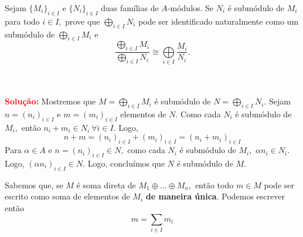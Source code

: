 \documentclass[11pt,a4paper]{article}
\newcounter{exercicio}[section]
\newcommand{\solucao}[1]{
\textbf{\textcolor{white}{oi}\\ \\ \textcolor{red}{Solução:}} #1}
\begin{document}
 Sejam $\{ M_i\}_{i \in I}$ e $\{ N_i\}_{i \in I}$ duas famílias de $A$-módulos. Se $N_i$ é submódulo de $M_i$ para todo $i \in I,$ prove que $\bigoplus\limits_{i \in I} N_i$ pode ser identificado naturalmente como um submódulo de $\bigoplus\limits_{i \in I} M_i$ e   \[\frac{\bigoplus\limits_{i \in I} M_i}{\bigoplus\limits_{i \in I} N_i } \cong \bigoplus\limits_{i \in I} \frac{M_i}{N_i}.\] 
\solucao{
Mostremos que $M = \bigoplus\limits_{i \in I} M_i$ é submódulo de $N = \bigoplus\limits_{i \in I} N_i.$
Sejam $n = (n_i)_{i \in I}$ e $m = (m_i)_{i \in I}$ elementos de $N.$ Como cada $N_i$ é submódulo de $M_i,$ então $n_i + m_i \in N_i \ \forall i \in I.$ Logo,
\[
n + m = (n_i)_{i \in I} + (m_i)_{i \in I} = (n_i + m_i)_{i \in I}
\]
Para $\alpha \in A$ e $n = (n_i)_{i \in I} \in N,$ como cada $N_i$ é submódulo de $M_i,$ $\alpha n_i \in N_i.$ Logo, $(\alpha n_i)_{i \in I} \in N.$ Logo, concluímos que $N$ é submódulo de $M.$

Sabemos que, se $M$ é soma direta de $ M_1 \oplus \ldots \oplus M_n,$ então todo $m \in M$ pode ser escrito como soma de elementos de $M_i$ \textbf{de maneira única}. Podemos escrever então
\[m = \sum\limits_{i \in I} m_i\]

}
\end{document}
